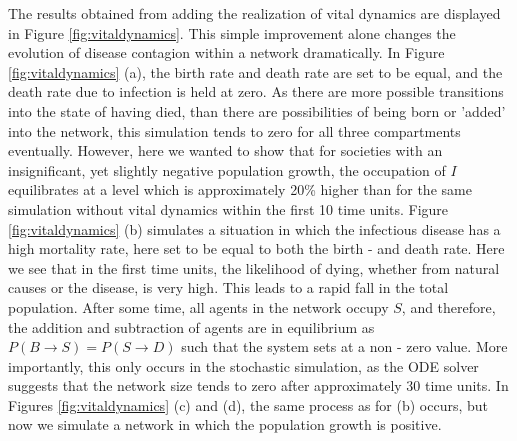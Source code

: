The results obtained from adding the realization of vital dynamics are displayed in Figure \ref{fig:vitaldynamics}. This simple improvement alone changes the evolution of disease contagion within a network dramatically. In Figure \ref{fig:vitaldynamics} (a), the birth rate and death rate are set to be equal, and the death rate due to infection is held at zero. As there are more possible transitions into the state of having died, than there are possibilities of being born or 'added' into the network, this simulation tends to zero for all three compartments eventually. However, here we wanted to show that for societies with an insignificant, yet slightly negative population growth, the occupation of $I$ equilibrates at a level which is approximately 20\% higher than for the same simulation without vital dynamics within the first 10 time units. Figure \ref{fig:vitaldynamics} (b) simulates a situation in which the infectious disease has a high mortality rate, here set to be equal to both the birth - and death rate. Here we see that in the first time units, the likelihood of dying, whether from natural causes or the disease, is very high. This leads to a rapid fall in the total population. After some time, all agents in the network occupy $S$, and therefore, the addition and subtraction of agents are in equilibrium as $P(B\to S) = P(S\to D)$ such that the system sets at a non - zero value. More importantly, this only occurs in the stochastic simulation, as the ODE solver suggests that the network size tends to zero after approximately 30 time units. In Figures \ref{fig:vitaldynamics} (c) and (d), the same process as for (b) occurs, but now we simulate a network in which the population growth is positive. 
\\ \\
